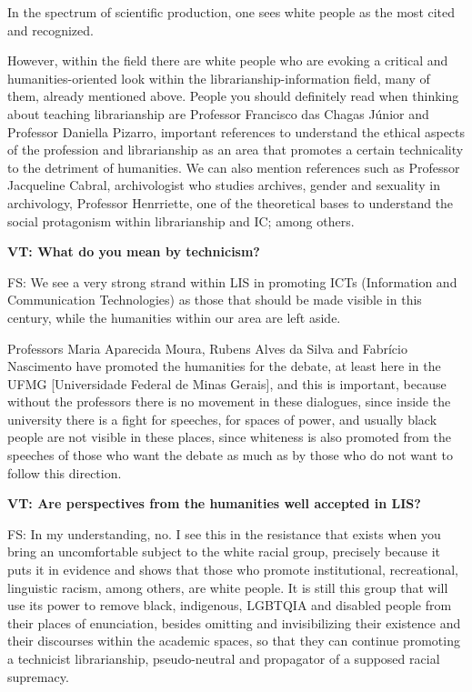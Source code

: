 \documentclass[a4paper,
fontsize=11pt,
oneside,
numbers=noperiodatend,
parskip=half-,
bibliography=totoc,
final
]{scrartcl}
\begin{document}
In the spectrum of scientific production, one sees white people as the
most cited and recognized.

However, within the field there are white people who are evoking a
critical and humanities-oriented look within the
librarianship-information field, many of them, already mentioned above.
People you should definitely read when thinking about teaching
librarianship are Professor Francisco das Chagas Júnior and Professor
Daniella Pizarro, important references to understand the ethical aspects
of the profession and librarianship as an area that promotes a certain
technicality to the detriment of humanities. We can also mention
references such as Professor Jacqueline Cabral, archivologist who
studies archives, gender and sexuality in archivology, Professor
Henrriette, one of the theoretical bases to understand the social
protagonism within librarianship and IC; among others.

\textbf{VT: What do you mean by technicism?}

FS: We see a very strong strand within LIS in promoting ICTs
(Information and Communication Technologies) as those that should be
made visible in this century, while the humanities within our area are
left aside.

Professors Maria Aparecida Moura, Rubens Alves da Silva and Fabrício
Nascimento have promoted the humanities for the debate, at least here in
the UFMG {[}Universidade Federal de Minas Gerais{]}, and this is
important, because without the professors there is no movement in these
dialogues, since inside the university there is a fight for speeches,
for spaces of power, and usually black people are not visible in these
places, since whiteness is also promoted from the speeches of those who
want the debate as much as by those who do not want to follow this
direction.

\textbf{VT: Are perspectives from the humanities well accepted in LIS?}

FS: In my understanding, no. I see this in the resistance that exists
when you bring an uncomfortable subject to the white racial group,
precisely because it puts it in evidence and shows that those who
promote institutional, recreational, linguistic racism, among others,
are white people. It is still this group that will use its power to
remove black, indigenous, LGBTQIA and disabled people from their places
of enunciation, besides omitting and invisibilizing their existence and
their discourses within the academic spaces, so that they can continue
promoting a technicist librarianship, pseudo-neutral and propagator of a
supposed racial supremacy.
\end{document}
